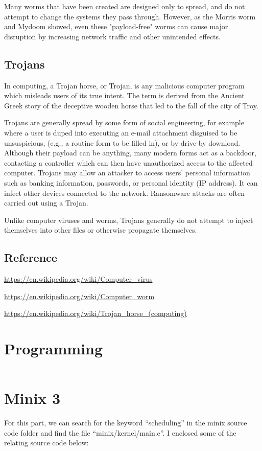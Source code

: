 \documentclass{article}
\begin{document}
Many worms that have been created are designed only to spread, and do not attempt to change the systems they pass through. However, as the Morris worm and Mydoom showed, even these "payload-free" worms can cause major disruption by increasing network traffic and other unintended effects.

\subsection*{Trojans}
In computing, a Trojan horse, or Trojan, is any malicious computer program which misleads users of its true intent. The term is derived from the Ancient Greek story of the deceptive wooden horse that led to the fall of the city of Troy.

Trojans are generally spread by some form of social engineering, for example where a user is duped into executing an e-mail attachment disguised to be unsuspicious, (e.g., a routine form to be filled in), or by drive-by download. Although their payload can be anything, many modern forms act as a backdoor, contacting a controller which can then have unauthorized access to the affected computer. Trojans may allow an attacker to access users' personal information such as banking information, passwords, or personal identity (IP address). It can infect other devices connected to the network. Ransomware attacks are often carried out using a Trojan.

Unlike computer viruses and worms, Trojans generally do not attempt to inject themselves into other files or otherwise propagate themselves.

\subsection*{Reference}
\url{https://en.wikipedia.org/wiki/Computer_virus}

\url{https://en.wikipedia.org/wiki/Computer_worm}

\url{https://en.wikipedia.org/wiki/Trojan_horse_(computing)}

\section{Programming}
\inputminted{c++}{ex4.cpp}

\section{Minix 3}
For this part, we can search for the keyword ``scheduling'' in the minix source code folder and find the file ``minix/kernel/main.c''. I enclosed some of the relating source code below:
\end{document}
